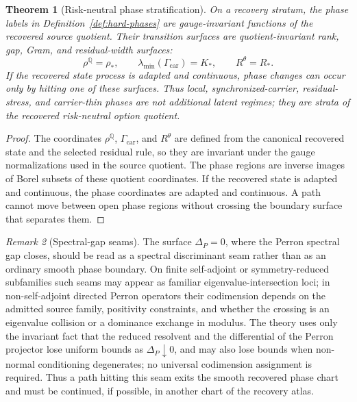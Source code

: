 \documentclass[11pt,a4paper]{amsart}
\theoremstyle{plain}
\newtheorem{theorem}{Theorem}[section]
\theoremstyle{definition}
\theoremstyle{remark}
\newtheorem{remark}[theorem]{Remark}
\newcommand{\QQ}{\mathbb{Q}}
\begin{document}
\begin{theorem}[Risk-neutral phase stratification]\label{thm:phase-stratification}
On a recovery stratum, the phase labels in Definition~\ref{def:hard-phases} are gauge-invariant
functions of the recovered source quotient.  Their transition surfaces are quotient-invariant
rank, gap, Gram, and residual-width surfaces:
\[
        \rho^\QQ=\rho_*,
        \qquad
        \lambda_{\min}(\Gamma_{\mathrm{car}})=K_*,
        \qquad
        R^\theta=R_* .
\]
If the recovered state process is adapted and continuous, phase changes can occur only by hitting
one of these surfaces.  Thus local, synchronized-carrier, residual-stress, and carrier-thin phases
are not additional latent regimes; they are strata of the recovered risk-neutral option quotient.
\end{theorem}

\begin{proof}
The coordinates \(\rho^\QQ\), \(\Gamma_{\mathrm{car}}\), and \(R^\theta\) are defined from the
canonical recovered state and the selected residual rule, so they are invariant under the gauge
normalizations used in the source quotient.  The phase regions are inverse images of Borel subsets
of these quotient coordinates.  If the recovered state is adapted and continuous, the phase
coordinates are adapted and continuous.  A path cannot move between open phase regions without
crossing the boundary surface that separates them.
\end{proof}

\begin{remark}[Spectral-gap seams]\label{rem:spectral-gap-seams}
The surface \(\Delta_P=0\), where the Perron spectral gap closes, should be read as a spectral
discriminant seam rather than as an ordinary smooth phase boundary.  On finite self-adjoint or
symmetry-reduced subfamilies such seams may appear as familiar eigenvalue-intersection loci; in
non-self-adjoint directed Perron operators their codimension depends on the admitted source
family, positivity constraints, and whether the crossing is an eigenvalue collision or a
dominance exchange in modulus.  The theory uses only the invariant fact that the reduced resolvent
and the differential of the Perron projector lose uniform bounds as \(\Delta_P\downarrow0\), and
may also lose bounds when non-normal conditioning degenerates; no universal codimension assignment
is required.  Thus a path hitting this seam exits the smooth recovered phase chart
and must be continued, if possible, in another chart of the recovery atlas.
\end{remark}
\end{document}
